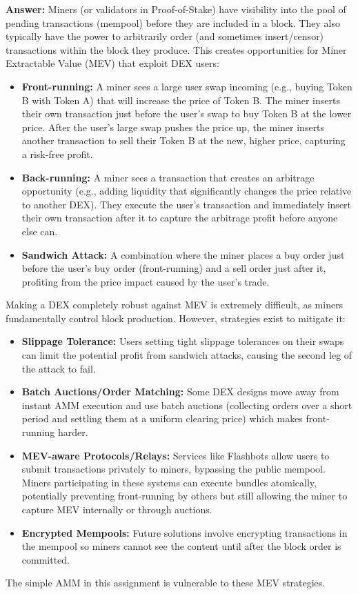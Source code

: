\documentclass[12pt]{article}
\begin{document}
\textbf{Answer:} Miners (or validators in Proof-of-Stake) have visibility into the pool of pending transactions (mempool) before they are included in a block. They also typically have the power to arbitrarily order (and sometimes insert/censor) transactions within the block they produce. This creates opportunities for Miner Extractable Value (MEV) that exploit DEX users:
\begin{itemize}
    \item \textbf{Front-running:} A miner sees a large user swap incoming (e.g., buying Token B with Token A) that will increase the price of Token B. The miner inserts their own transaction just before the user's swap to buy Token B at the lower price. After the user's large swap pushes the price up, the miner inserts another transaction to sell their Token B at the new, higher price, capturing a risk-free profit.
    \item \textbf{Back-running:} A miner sees a transaction that creates an arbitrage opportunity (e.g., adding liquidity that significantly changes the price relative to another DEX). They execute the user's transaction and immediately insert their own transaction after it to capture the arbitrage profit before anyone else can.
    \item \textbf{Sandwich Attack:} A combination where the miner places a buy order just before the user's buy order (front-running) and a sell order just after it, profiting from the price impact caused by the user's trade.
\end{itemize}
Making a DEX completely robust against MEV is extremely difficult, as miners fundamentally control block production. However, strategies exist to mitigate it:
\begin{itemize}
    \item \textbf{Slippage Tolerance:} Users setting tight slippage tolerances on their swaps can limit the potential profit from sandwich attacks, causing the second leg of the attack to fail.
    \item \textbf{Batch Auctions/Order Matching:} Some DEX designs move away from instant AMM execution and use batch auctions (collecting orders over a short period and settling them at a uniform clearing price) which makes front-running harder.
    \item \textbf{MEV-aware Protocols/Relays:} Services like Flashbots allow users to submit transactions privately to miners, bypassing the public mempool. Miners participating in these systems can execute bundles atomically, potentially preventing front-running by others but still allowing the miner to capture MEV internally or through auctions.
    \item \textbf{Encrypted Mempools:} Future solutions involve encrypting transactions in the mempool so miners cannot see the content until after the block order is committed.
\end{itemize}
The simple AMM in this assignment is vulnerable to these MEV strategies.
\end{document}

